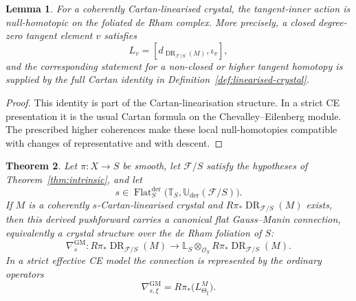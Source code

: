 \documentclass[11pt,reqno,a4paper,dvipsnames,x11names]{amsart}
\numberwithin{equation}{section}
\theoremstyle{plain}
\newtheorem{theorem}{Theorem}[section]
\newtheorem{lemma}[theorem]{Lemma}
\theoremstyle{definition}
\theoremstyle{remark}
\newcommand{\cO}{\mathcal{O}}
\DeclareMathOperator{\DR}{DR}
\newcommand{\cF}{\mathcal F}
\newcommand{\Uder}{\mathbb U_{\mathrm{der}}}
\newcommand{\bbT}{\mathbb T}
\newcommand{\bbL}{\mathbb L}
\newcommand{\from}{\colon}
\newcommand{\GM}{\mathrm{GM}}
\begin{document}
\begin{lemma}\label{lem:cartan-homotopy}
For a coherently Cartan-linearised crystal, the tangent-inner action is null-homotopic on the foliated de Rham complex. More precisely, a closed degree-zero tangent element \(v\) satisfies
\[
 L_v=[d_{\DR_{\cF/S}(M)},\iota_v],
\]
and the corresponding statement for a non-closed or higher tangent homotopy is supplied by the full Cartan identity in Definition~\ref{def:linearised-crystal}.
\end{lemma}

\begin{proof}
This identity is part of the Cartan-linearisation structure. In a strict CE presentation it is the usual Cartan formula on the Chevalley--Eilenberg module. The prescribed higher coherences make these local null-homotopies compatible with changes of representative and with descent.
\end{proof}

\begin{theorem}\label{thm:GM}
Let \(\pi\from X\to S\) be smooth, let \(\cF/S\) satisfy the hypotheses of Theorem~\ref{thm:intrinsic}, and let
\[
 s\in\operatorname{Flat}^{\mathrm{der}}_S
 \bigl(\bbT_S,\Uder(\cF/S)\bigr).
\]
If \(M\) is a coherently \(s\)-Cartan-linearised crystal and
\(R\pi_*\DR_{\cF/S}(M)\) exists, then this derived pushforward carries a canonical flat Gauss--Manin connection, equivalently a crystal structure over the de Rham foliation of \(S\):
\[
 \nabla^{\GM}_s\from
 R\pi_*\DR_{\cF/S}(M)
 \longrightarrow
 \bbL_S\otimes_{\cO_S}
 R\pi_*\DR_{\cF/S}(M).
\]
In a strict effective CE model the connection is represented by the ordinary operators
\[
 \nabla^{\GM}_{s,\xi}
 =R\pi_*\bigl(L^M_{\Theta_\xi}\bigr).
\]
\end{theorem}
\end{document}
